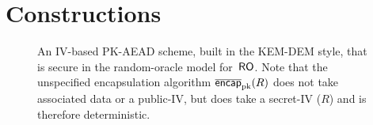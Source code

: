 \section{Constructions}
\label{sec:constructions}

\begin{figure}
\begin{center}
\caption{An IV-based PK-AEAD scheme, built in the KEM-DEM style, that is secure in the random-oracle model for~$\mathsf{RO}$. Note that the unspecified encapsulation algorithm $\overline{\mathsf{encap}}_{\mathrm{pk}}^{}(R)$ does not take associated data or a public-IV, but does take a secret-IV ($R$) and
is therefore deterministic. }
\label{fig:ro-kem-dem-construction}
\end{center}
\end{figure}
